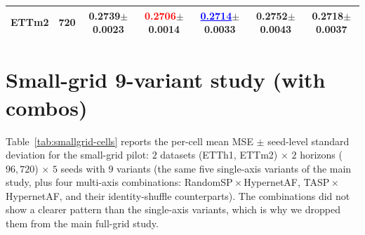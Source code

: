 \begin{table}[h]
\begin{center}
\begin{tabular}{l|c|ccccc}
    ETTm2 & 720 & 0.2739{\scriptsize $\pm$0.0023} & \textcolor{red}{\textbf{0.2706}}{\scriptsize $\pm$0.0014} & \textcolor{blue}{\underline{0.2714}}{\scriptsize $\pm$0.0033} & 0.2752{\scriptsize $\pm$0.0043} & 0.2718{\scriptsize $\pm$0.0037} \\
    \bottomrule
  \end{tabular}
  \end{center}
\end{table}

\section{Small-grid 9-variant study (with combos)}
\label{app:small-grid-combos}

Table~\ref{tab:smallgrid-cells} reports the per-cell mean MSE
$\pm$ seed-level standard deviation for the small-grid pilot:
$2$ datasets (ETTh1, ETTm2) $\times$ $2$ horizons ($96, 720$)
$\times$ $5$ seeds with $9$ variants (the same five single-axis
variants of the main study, plus four multi-axis combinations:
RandomSP\,$\times$\,HypernetAF, TASP\,$\times$\,HypernetAF, and
their identity-shuffle counterparts). The combinations did not show a
clearer pattern than the single-axis variants, which is why we dropped
them from the main full-grid study.

